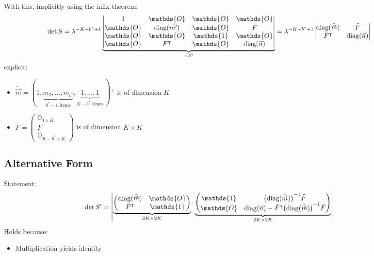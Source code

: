 \documentclass[
	english,
	a4paper,
	fontsize=10pt,
	parskip=half,
	titlepage=true,
	DIV=12,
	final
]{scrreprt}
\newcommand*{\transp}{\ensuremath{^\intercal}}
\DeclareMathOperator{\diag}{diag}
\begin{document}
With this, implicitly using the infix theorem:
\begin{align}
	\det S
&=
	\lambda^{-K - b^* + 1}
	\underbrace{\mqty|
		1			& \mathds{O} 		& \mathds{O}		& \mathds{O} \\
		\mathds{O}	& \diag(\vec{m'})	& \mathds{O}		& F          \\
		\mathds{O}	& \mathds{O}			& \mathds{1}		& \mathds{O} \\
		\mathds{O}	& F\transp			& \mathds{O}		& \diag(\vec{n})
	|}_{= S'}
=
	\lambda^{-K - b^* + 1}
	\mqty|
		\diag(\tilde{\vec{m}})	& \tilde{F}			\\
		\tilde{F}\transp			& \diag(\vec{n})
	|
\label{eqn:detS_protoform}
\end{align}
explicit:
\begin{itemize}
\item $\tilde{\vec{m}} = (
	1,
	\underbrace{m_2, \ldots, m_{b^*}}_{b^* -1 \text{ items}},
	\underbrace{1, \ldots, 1}_{K - b^* \text{ times}}
	~)\transp$ is of dimension $K$
\item $\tilde{F} = \begin{pmatrix}
		\mathds{O}_{1 \times K} \\ 
		F \\ 
		\mathds{O}_{K - b^* \times K}
	\end{pmatrix}$
	is of dimension $K \times K$
\end{itemize}

\subsection{Alternative Form}
Statement:
\begin{align}
	\det S'
&=
	\mqty|
		\underbrace{\begin{pmatrix}
			\diag(\tilde{\vec{m}})	& \mathds{O}			\\
			\tilde{F}\transp			& \mathds{1}
		\end{pmatrix}}_{2K \times 2K}
		\cdot
		\underbrace{\begin{pmatrix}
			\mathds{1}	&	\qty(\diag(\tilde{\vec{m}}))^{-1} \tilde{F}		\\
			\mathds{O}	&	\diag(\vec{n}) - \tilde{F}\transp \qty(\diag(\tilde{\vec{m}}))^{-1}\tilde{F}
		\end{pmatrix}}_{2K \times 2K}
	|
	\label{eqn:detProto}
\end{align}
Holds because:
\begin{itemize}
\item Multiplication yields identity
\end{itemize}
\end{document}
